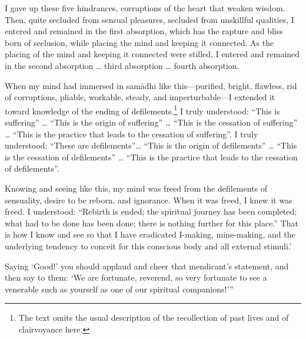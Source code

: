 \documentclass[12pt,openany]{book}%
\begin{document}
I gave up these five hindrances, corruptions of the heart that weaken wisdom. Then, quite secluded from sensual pleasures, secluded from unskillful qualities, I entered and remained in the first absorption, which has the rapture and bliss born of seclusion, while placing the mind and keeping it connected. As the placing of the mind and keeping it connected were stilled, I entered and remained in the second absorption … third absorption … fourth absorption. 

When my mind had immersed in \textsanskrit{samādhi} like this—purified, bright, flawless, rid of corruptions, pliable, workable, steady, and imperturbable—I extended it toward knowledge of the ending of defilements.\footnote{The text omits the usual description of the recollection of past lives and of clairvoyance here. } I truly understood: “This is suffering” … “This is the origin of suffering” … “This is the cessation of suffering” … “This is the practice that leads to the cessation of suffering”. I truly understood: “These are defilements”… “This is the origin of defilements” … “This is the cessation of defilements” … “This is the practice that leads to the cessation of defilements”. 

Knowing and seeing like this, my mind was freed from the defilements of sensuality, desire to be reborn, and ignorance. When it was freed, I knew it was freed. I understood: “Rebirth is ended; the spiritual journey has been completed; what had to be done has been done; there is nothing further for this place.” That is how I know and see so that I have eradicated I-making, mine-making, and the underlying tendency to conceit for this conscious body and all external stimuli.’ 

Saying ‘Good!’ you should applaud and cheer that mendicant’s statement, and then say to them: ‘We are fortunate, reverend, so very fortunate to see a venerable such as yourself as one of our spiritual companions!’” 
\end{document}
